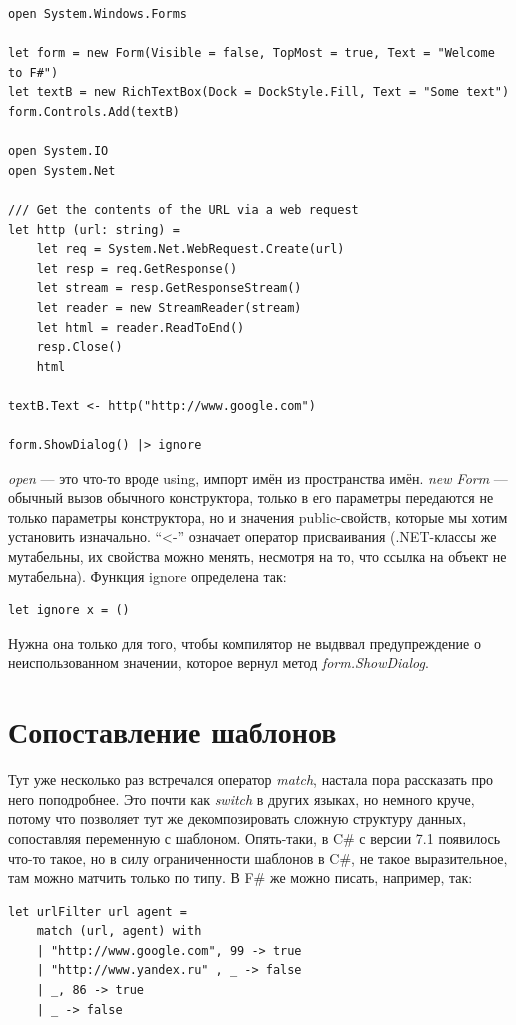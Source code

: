 \documentclass[a5paper]{article}
\begin{document}
\begin{verbatim}
open System.Windows.Forms

let form = new Form(Visible = false, TopMost = true, Text = "Welcome to F#")
let textB = new RichTextBox(Dock = DockStyle.Fill, Text = "Some text")
form.Controls.Add(textB)

open System.IO
open System.Net

/// Get the contents of the URL via a web request
let http (url: string) =
    let req = System.Net.WebRequest.Create(url)
    let resp = req.GetResponse()
    let stream = resp.GetResponseStream()
    let reader = new StreamReader(stream)
    let html = reader.ReadToEnd()
    resp.Close()
    html

textB.Text <- http("http://www.google.com")

form.ShowDialog() |> ignore
\end{verbatim}

\textit{open} --- это что-то вроде using, импорт имён из пространства имён. \textit{new Form} --- обычный вызов обычного конструктора, только в его параметры передаются не только параметры конструктора, но и значения public-свойств, которые мы хотим установить изначально. ``<-'' означает оператор присваивания (.NET-классы же мутабельны, их свойства можно менять, несмотря на то, что ссылка на объект не мутабельна). Функция ignore определена так:

\begin{verbatim}
let ignore x = ()
\end{verbatim}

Нужна она только для того, чтобы компилятор не выдввал предупреждение о неиспользованном значении, которое вернул метод \textit{form.ShowDialog}.

\section{Сопоставление шаблонов}

Тут уже несколько раз встречался оператор \textit{match}, настала пора рассказать про него поподробнее. Это почти как \textit{switch} в других языках, но немного круче, потому что позволяет тут же декомпозировать сложную структуру данных, сопоставляя переменную с шаблоном. Опять-таки, в C\# с версии 7.1 появилось что-то такое, но в силу ограниченности шаблонов в C\#, не такое выразительное, там можно матчить только по типу. В F\# же можно писать, например, так:

\begin{verbatim}
let urlFilter url agent =
    match (url, agent) with
    | "http://www.google.com", 99 -> true
    | "http://www.yandex.ru" , _ -> false
    | _, 86 -> true
    | _ -> false
\end{verbatim}
\end{document}
